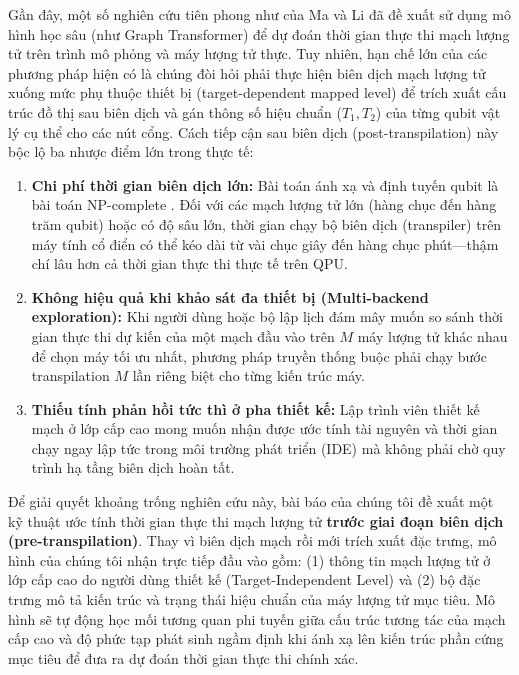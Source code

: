 \documentclass[11pt, a4paper]{article}
\begin{document}
Gần đây, một số nghiên cứu tiên phong như của Ma và Li \cite{ma2025understanding} đã đề xuất sử dụng mô hình học sâu (như Graph Transformer) để dự đoán thời gian thực thi mạch lượng tử trên trình mô phỏng và máy lượng tử thực. Tuy nhiên, hạn chế lớn của các phương pháp hiện có là chúng đòi hỏi phải thực hiện biên dịch mạch lượng tử xuống mức phụ thuộc thiết bị (target-dependent mapped level) để trích xuất cấu trúc đồ thị sau biên dịch và gán thông số hiệu chuẩn ($T_1, T_2$) của từng qubit vật lý cụ thể cho các nút cổng. Cách tiếp cận sau biên dịch (post-transpilation) này bộc lộ ba nhược điểm lớn trong thực tế:
\begin{enumerate}
    \item \textbf{Chi phí thời gian biên dịch lớn:} Bài toán ánh xạ và định tuyến qubit là bài toán NP-complete \cite{li2019tackling}. Đối với các mạch lượng tử lớn (hàng chục đến hàng trăm qubit) hoặc có độ sâu lớn, thời gian chạy bộ biên dịch (transpiler) trên máy tính cổ điển có thể kéo dài từ vài chục giây đến hàng chục phút—thậm chí lâu hơn cả thời gian thực thi thực tế trên QPU.
    \item \textbf{Không hiệu quả khi khảo sát đa thiết bị (Multi-backend exploration):} Khi người dùng hoặc bộ lập lịch đám mây muốn so sánh thời gian thực thi dự kiến của một mạch đầu vào trên $M$ máy lượng tử khác nhau để chọn máy tối ưu nhất, phương pháp truyền thống buộc phải chạy bước transpilation $M$ lần riêng biệt cho từng kiến trúc máy.
    \item \textbf{Thiếu tính phản hồi tức thì ở pha thiết kế:} Lập trình viên thiết kế mạch ở lớp cấp cao mong muốn nhận được ước tính tài nguyên và thời gian chạy ngay lập tức trong môi trường phát triển (IDE) mà không phải chờ quy trình hạ tầng biên dịch hoàn tất.
\end{enumerate}

Để giải quyết khoảng trống nghiên cứu này, bài báo của chúng tôi đề xuất một kỹ thuật ước tính thời gian thực thi mạch lượng tử \textbf{trước giai đoạn biên dịch (pre-transpilation)}. Thay vì biên dịch mạch rồi mới trích xuất đặc trưng, mô hình của chúng tôi nhận trực tiếp đầu vào gồm: (1) thông tin mạch lượng tử ở lớp cấp cao do người dùng thiết kế (Target-Independent Level) và (2) bộ đặc trưng mô tả kiến trúc và trạng thái hiệu chuẩn của máy lượng tử mục tiêu. Mô hình sẽ tự động học mối tương quan phi tuyến giữa cấu trúc tương tác của mạch cấp cao và độ phức tạp phát sinh ngầm định khi ánh xạ lên kiến trúc phần cứng mục tiêu để đưa ra dự đoán thời gian thực thi chính xác.
\end{document}
